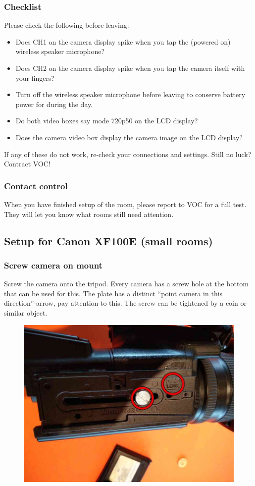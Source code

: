 \documentclass{article}
\begin{document}
\subsubsection{Checklist}
Please check the following before leaving:
\begin{itemize}
  \item Does CH1 on the camera display spike when you tap the (powered on) wireless speaker microphone?
  \item Does CH2 on the camera display spike when you tap the camera itself with your fingers?
  \item Turn off the wireless speaker microphone before leaving to conserve battery power for during the day.
  \item Do both video boxes say mode 720p50 on the LCD display?
  \item Does the camera video box display the camera image on the LCD display?
\end{itemize}

If any of these do not work, re-check your connections and settings. Still no luck? Contract VOC!

\subsubsection{Contact control}
When you have finished setup of the room, please report to VOC for a full test.
They will let you know what rooms still need attention.

\subsection{Setup for Canon XF100E (small rooms)}

\subsubsection{Screw camera on mount}
Screw the camera onto the tripod. Every camera has a screw hole at the bottom that can be used for this. The plate has a distinct ``point camera in this direction''-arrow, pay attention to this. The screw can be tightened by a coin or similar object.

\begin{figure}[H]
  \centering
  \includegraphics[width = 120mm]{Cam00.jpg}
\end{figure}
\end{document}
